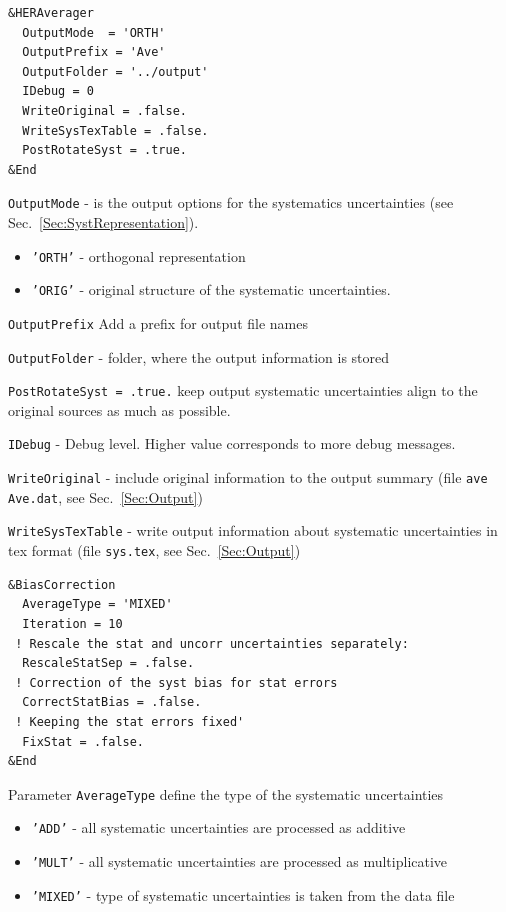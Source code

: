 \begin{verbatim}
&HERAverager
  OutputMode  = 'ORTH'
  OutputPrefix = 'Ave' 
  OutputFolder = '../output'   
  IDebug = 0
  WriteOriginal = .false.
  WriteSysTexTable = .false.
  PostRotateSyst = .true.
&End
\end{verbatim}

{\tt OutputMode} - is the output options for the systematics uncertainties (see Sec.~\ref{Sec:SystRepresentation}).
\begin{itemize}
\item {\tt 'ORTH'} - orthogonal representation
\item {\tt 'ORIG'} - original structure of the systematic uncertainties.
\end{itemize}

{\tt OutputPrefix} Add a prefix for output file names

{\tt OutputFolder} - folder, where the output information is stored

{\tt PostRotateSyst = .true.} keep output systematic uncertainties align to the original sources as much as possible.

{\tt IDebug} - Debug level. Higher value corresponds to more debug messages.

{\tt WriteOriginal} - include original information to the output summary (file {\tt ave Ave.dat}, see Sec.~\ref{Sec:Output}) 

{\tt WriteSysTexTable} - write output information about systematic uncertainties in tex format (file {\tt sys.tex}, see Sec.~\ref{Sec:Output})

\begin{verbatim}
&BiasCorrection
  AverageType = 'MIXED'
  Iteration = 10
 ! Rescale the stat and uncorr uncertainties separately:
  RescaleStatSep = .false.
 ! Correction of the syst bias for stat errors
  CorrectStatBias = .false.
 ! Keeping the stat errors fixed'
  FixStat = .false.
&End
\end{verbatim}
Parameter {\tt AverageType} define the type of the systematic uncertainties
\begin{itemize}
\item {\tt 'ADD'} - all systematic uncertainties are processed as additive
\item {\tt 'MULT'} - all systematic uncertainties are processed as multiplicative
\item {\tt 'MIXED'} - type of systematic uncertainties is taken from the data file
\end{itemize}

